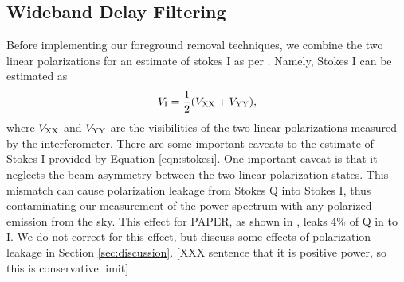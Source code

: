 \documentclass[twocolumn,numberedappendix]{emulateapj} \shorttitle{New Limits on the 21 cm Power Spectrum at $z=8.4$}
\begin{document}
%
%



\subsection{Wideband Delay Filtering}\label{sec:wbd_filtering}


Before implementing our foreground removal techniques, we combine the two
linear polarizations for an estimate of stokes I as per \citet{moore_et_al2013}.
Namely, Stokes I can be estimated as 
\begin{equation}\label{eqn:stokesi}
    V_{\rm I} = \frac12(V_{\rm XX}+V_{\rm YY}),
\end{equation}
where $V_{\rm XX}$ and $V_{\rm YY}$ are the visibilities of the two linear
polarizations measured by the interferometer. There are some important caveats
to the estimate of Stokes I provided by Equation \eqref{eqn:stokesi}. One
important caveat is that it neglects the beam asymmetry  between the two linear
polarization states. This mismatch can cause polarization leakage from Stokes
Q into Stokes I, thus contaminating  our measurement of the power spectrum with any polarized emission from the sky.
This effect for PAPER, as shown in \citet{moore_et_al2013}, leaks 4\% of Q in to
I.  We do not correct for this effect, but discuss some effects of 
polarization leakage in Section \ref{sec:discussion}. [XXX sentence that it is positive power, so this is conservative limit]
\end{document}
